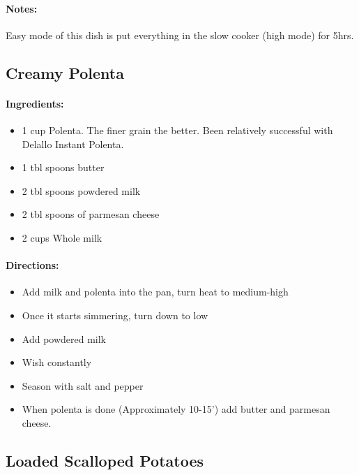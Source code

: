 \documentclass{article}
\begin{document}
\paragraph{Notes:}
Easy mode of this dish is put everything in the slow cooker (high mode) for 5hrs.

\subsection{Creamy Polenta}

\paragraph{Ingredients:}

\begin{itemize}
	\item 1 cup Polenta. The finer grain the better. Been relatively successful with Delallo Instant Polenta.
	\item 1 tbl spoons butter
	\item 2 tbl spoons powdered milk
	\item 2 tbl spoons of parmesan cheese
	\item 2 cups Whole milk
\end{itemize}

\paragraph{Directions:}
\begin{itemize}
	\item Add milk and polenta into the pan, turn heat to medium-high
	\item Once it starts simmering, turn down to low
	\item Add powdered milk
	\item Wish constantly
	\item Season with salt and pepper
	\item When polenta is done (Approximately 10-15’) add butter and parmesan cheese.
\end{itemize}

\subsection{Loaded Scalloped Potatoes}
\end{document}

